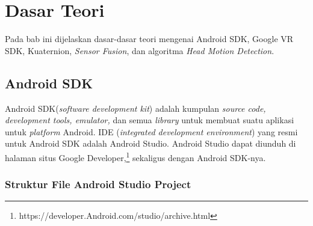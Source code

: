 \chapter{Dasar Teori}
\label{chap:dasar_teori}
Pada bab ini dijelaskan dasar-dasar teori mengenai Android SDK, Google VR SDK, Kuaternion, \textit{Sensor Fusion}, dan algoritma \textit{Head Motion Detection}.

\section{Android SDK}
\label{sec:Android_sdk}

Android SDK(\textit{software development kit}) adalah kumpulan \textit{source code, development tools, emulator,} dan semua \textit{library} untuk membuat suatu aplikasi untuk \textit{platform} Android\cite{Android_developers}. IDE (\textit{integrated development environment}) yang resmi untuk Android SDK adalah Android Studio. Android Studio dapat diunduh di halaman situs Google Developer,\footnote{https://developer.Android.com/studio/archive.html} sekaligus dengan Android SDK-nya.  

\subsection{Struktur File Android Studio Project}

